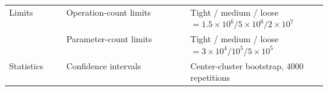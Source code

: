 \begin{center}
\begin{minipage}{\linewidth}
\begin{tabularx}{\linewidth}{Z{0.18\linewidth} Y Z{0.43\linewidth}}
\midrule

Limits
& Operation-count limits
& Tight / medium / loose
$=1.5{\times}10^6/5{\times}10^6/2{\times}10^7$ \\

& Parameter-count limits
& Tight / medium / loose
$=3{\times}10^4/10^5/5{\times}10^5$ \\

\midrule

Statistics
& Confidence intervals
& Center-cluster bootstrap, 4000 repetitions \\

\bottomrule
\end{tabularx}
\end{minipage}
\end{center}
